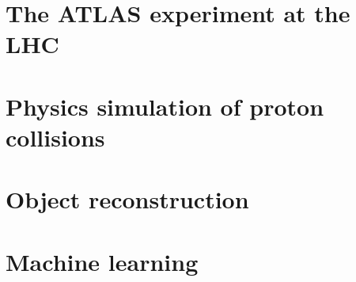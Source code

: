


\chapter{The ATLAS experiment at the LHC}
\label{chapter:ATLASLHC}


\chapter{Physics simulation of proton collisions}
\label{chapter:EventSim}


\chapter{Object reconstruction}
\label{chapter:EventReco}



\chapter{Machine learning}
\label{chapter:ML}
